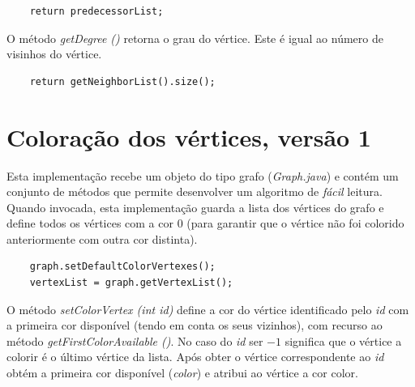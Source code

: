 \documentclass[a4paper,12pt]{report}
\begin{document}
\begin{lstlisting}
    return predecessorList;
\end{lstlisting}

O método \textit{getDegree ()} retorna o grau do vértice. Este é igual ao número de visinhos do vértice.

\begin{lstlisting}
    return getNeighborList().size();
\end{lstlisting}

\section{Coloração dos vértices, versão 1}

Esta implementação recebe um objeto do tipo grafo (\textit{Graph.java}) e contém um conjunto de métodos que permite desenvolver um algoritmo de \textit{fácil} leitura.
Quando invocada, esta implementação guarda a lista dos vértices do grafo e define todos os vértices com a cor $0$ (para garantir que o vértice não foi colorido anteriormente com outra cor distinta).

\begin{lstlisting}
    graph.setDefaultColorVertexes();
    vertexList = graph.getVertexList();
\end{lstlisting}

O método \textit{setColorVertex (int id)} define a cor do vértice identificado pelo \textit{id} com a primeira cor disponível (tendo em conta os seus vizinhos), com recurso ao método \textit{getFirstColorAvailable ()}. 
No caso do \textit{id} ser $-1$ significa que o vértice a colorir é o último vértice da lista.
Após obter o vértice correspondente ao \textit{id} obtém a primeira cor disponível (\textit{color}) e atribui ao vértice a cor color.

\begin{center}
\end{center}
\end{document}
